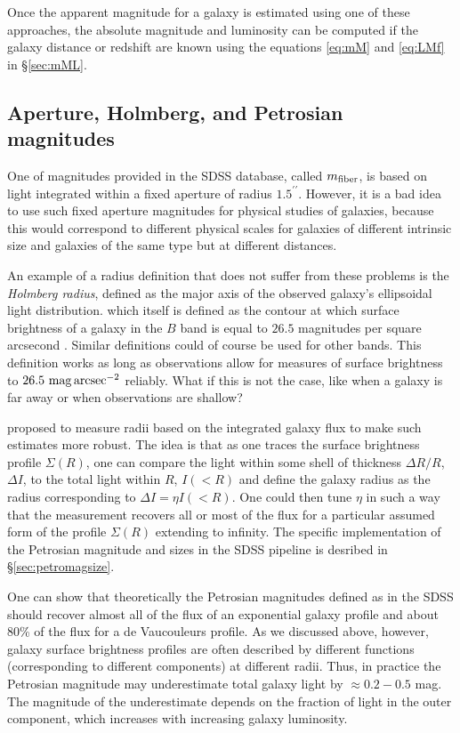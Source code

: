 Once the apparent magnitude for a galaxy is estimated using one of these approaches, the absolute magnitude and luminosity can be computed if the galaxy distance or redshift are known using the equations \ref{eq:mM} and \ref{eq:LMf} in  \S \ref{sec:mML}.
 
\subsection{Aperture, Holmberg, and Petrosian magnitudes}
\label{sec:apermags}

One of magnitudes provided in the SDSS database, called $m_{\rm fiber}$, is based on light integrated within a fixed aperture of radius $1.5^{\prime\prime}$. However, it is a bad idea to use such fixed aperture magnitudes for physical studies of galaxies, because this would correspond to different physical scales for galaxies of different intrinsic size and galaxies of the same type but at different distances. 

An example of a radius definition that does not suffer from these problems is the {\it Holmberg radius\/}, defined as the major axis of the observed galaxy's ellipsoidal light distribution. which itself is defined as the contour at which surface brightness of a galaxy in the $B$ band is equal to $26.5$  magnitudes per square arcsecond \href{http://adsabs.harvard.edu/abs/1958MeLuS.136....1H}{\citep{holmberg58}}. Similar definitions could of course be used for other bands. This definition works as long as observations allow for measures of surface brightness to $26.5\rm\ mag\,arcsec^{-2}$ reliably. What if this is not the case, like when a galaxy is far away or when observations are shallow?

\href{http://adsabs.harvard.edu/abs/1976ApJ...209L...1P}{\citet{petrosian76}} proposed to measure radii based on the integrated galaxy flux to make such estimates more robust. The idea is that as one traces the surface brightness profile $\Sigma(R)$, one can compare the light within some shell of thickness $\Delta R/R$, $\Delta I$, to the total light within $R$, $I(<R)$ and define the galaxy radius as the radius corresponding to $\Delta I=\eta I(<R)$. One could then tune $\eta$ in such a way that the measurement recovers all or most of the flux for a particular assumed form of the profile $\Sigma(R)$ extending to infinity. The specific implementation of the Petrosian magnitude and sizes in the SDSS pipeline is desribed in \S \ref{sec:petromagsize}.

 One can show that theoretically the Petrosian magnitudes defined as in the SDSS should recover almost all of the flux of an exponential galaxy profile and about 80\% of the flux for a de Vaucouleurs profile.
 As we discussed above, however, galaxy surface brightness profiles are often described by different functions (corresponding to different components) at different radii. Thus, in practice the Petrosian magnitude may underestimate total galaxy light by $\approx 0.2-0.5$ mag. The magnitude of the underestimate depends on the fraction of light in the outer component, which increases with increasing galaxy luminosity. 
 
